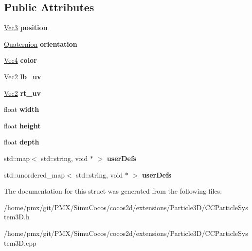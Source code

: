 \subsection*{Public Attributes}
\begin{DoxyCompactItemize}
\item 
\mbox{\label{structParticle3D_a00465ebbcc11136b045e8e84f586d2bf}} 
\hyperlink{classVec3}{Vec3} {\bfseries position}
\item 
\mbox{\label{structParticle3D_a412121ff95be557d08e0883431b21f73}} 
\hyperlink{classQuaternion}{Quaternion} {\bfseries orientation}
\item 
\mbox{\label{structParticle3D_af7b8ce1667c103e4df61876b8e863b77}} 
\hyperlink{classVec4}{Vec4} {\bfseries color}
\item 
\mbox{\label{structParticle3D_ac0cda3c696581f23caba9ef9ec254949}} 
\hyperlink{classVec2}{Vec2} {\bfseries lb\+\_\+uv}
\item 
\mbox{\label{structParticle3D_ae4fa713ed1d5e2beb065c8479e27d7e6}} 
\hyperlink{classVec2}{Vec2} {\bfseries rt\+\_\+uv}
\item 
\mbox{\label{structParticle3D_a7ce1ca89af7f49b4e9298cb74b042866}} 
float {\bfseries width}
\item 
\mbox{\label{structParticle3D_a25bcbad635dc0e7cb21ac4629e5ed338}} 
float {\bfseries height}
\item 
\mbox{\label{structParticle3D_a5dd51a9ed24520eaec3af0a1aa9a39d0}} 
float {\bfseries depth}
\item 
\mbox{\label{structParticle3D_a82f8265364053d89c231d5ea56e921ff}} 
std\+::map$<$ std\+::string, void $\ast$ $>$ {\bfseries user\+Defs}
\item 
\mbox{\label{structParticle3D_a43467ab1b529f8c31213a52f3a648f32}} 
std\+::unordered\+\_\+map$<$ std\+::string, void $\ast$ $>$ {\bfseries user\+Defs}
\end{DoxyCompactItemize}


The documentation for this struct was generated from the following files\+:\begin{DoxyCompactItemize}
\item 
/home/pmx/git/\+P\+M\+X/\+Simu\+Cocos/cocos2d/extensions/\+Particle3\+D/C\+C\+Particle\+System3\+D.\+h\item 
/home/pmx/git/\+P\+M\+X/\+Simu\+Cocos/cocos2d/extensions/\+Particle3\+D/C\+C\+Particle\+System3\+D.\+cpp\end{DoxyCompactItemize}
